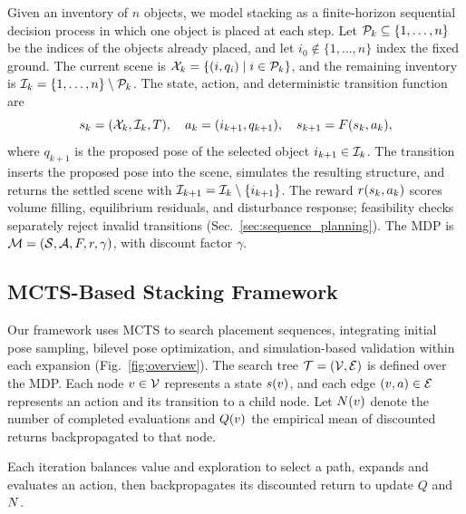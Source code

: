 Given an inventory of $n$ objects, we model stacking as a finite-horizon sequential decision process in which one object is placed at each step.
Let $\mathcal{P}_k\subseteq\{1,\ldots,n\}$ be the indices of the objects already placed, and let $i_0\notin\{1,\ldots,n\}$ index the fixed ground.
The current scene is $\mathcal{X}_k=\{(i,q_i)\mid i\in\mathcal{P}_k\}$, and the remaining inventory is $\mathcal{I}_k=\{1,\ldots,n\}\setminus\mathcal{P}_k$.
The state, action, and deterministic transition function are
\begin{equation*}
    s_k=(\mathcal{X}_k,\mathcal{I}_k,T),\quad
    a_k=(i_{k+1},q_{k+1}),\quad
    s_{k+1}=F(s_k,a_k),
\end{equation*}
where $q_{k+1}$ is the proposed pose of the selected object $i_{k+1}\in\mathcal{I}_k$. The transition inserts the proposed pose into the scene, simulates the resulting structure, and returns the settled scene with $\mathcal{I}_{k+1}=\mathcal{I}_k\setminus\{i_{k+1}\}$.
The reward $r(s_k,a_k)$ scores volume filling, equilibrium residuals, and disturbance response; feasibility checks separately reject invalid transitions (Sec.~\ref{sec:sequence_planning}).
The MDP is $\mathcal{M}=(\mathcal{S},\mathcal{A},F,r,\gamma)$, with discount factor $\gamma$.

\subsection{MCTS-Based Stacking Framework}

Our framework uses MCTS to search placement sequences, integrating initial pose sampling, bilevel pose optimization, and simulation-based validation within each expansion (Fig.~\ref{fig:overview}).
The search tree $\mathcal{T}=(\mathcal{V},\mathcal{E})$ is defined over the MDP.
Each node $v\in\mathcal{V}$ represents a state $s(v)$, and each edge $(v,a)\in\mathcal{E}$ represents an action and its transition to a child node.
Let $N(v)$ denote the number of completed evaluations and $Q(v)$ the empirical mean of discounted returns backpropagated to that node.

Each iteration balances value and exploration to select a path, expands and evaluates an action, then backpropagates its discounted return to update $Q$ and $N$.

